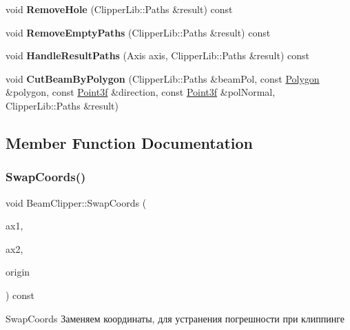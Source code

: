 \begin{DoxyCompactItemize}
\item 
\mbox{\label{class_beam_clipper_ad2f4275446958ac5bf0473cb063592f8}} 
void {\bfseries Remove\+Hole} (Clipper\+Lib\+::\+Paths \&result) const
\item 
\mbox{\label{class_beam_clipper_a288079b1c1031b1bdcdaaaf67e067318}} 
void {\bfseries Remove\+Empty\+Paths} (Clipper\+Lib\+::\+Paths \&result) const
\item 
\mbox{\label{class_beam_clipper_a8cae032f9278d61e5e3604d532e61642}} 
void {\bfseries Handle\+Result\+Paths} (Axis axis, Clipper\+Lib\+::\+Paths \&result) const
\item 
\mbox{\label{class_beam_clipper_a87e2b0717f23447e10a5104431d74cc4}} 
void {\bfseries Cut\+Beam\+By\+Polygon} (Clipper\+Lib\+::\+Paths \&beam\+Pol, const \mbox{\hyperlink{class_polygon}{Polygon}} \&polygon, const \mbox{\hyperlink{struct_point3f}{Point3f}} \&direction, const \mbox{\hyperlink{struct_point3f}{Point3f}} \&pol\+Normal, Clipper\+Lib\+::\+Paths \&result)
\end{DoxyCompactItemize}


\subsection{Member Function Documentation}
\mbox{\label{class_beam_clipper_a8afe4452a3ed644e467df223da280c2c}} 
\subsubsection{\texorpdfstring{Swap\+Coords()}{SwapCoords()}}
{\footnotesize\ttfamily void Beam\+Clipper\+::\+Swap\+Coords (\begin{DoxyParamCaption}\item[{Axis}]{ax1,  }\item[{Axis}]{ax2,  }\item[{Clipper\+Lib\+::\+Paths \&}]{origin }\end{DoxyParamCaption}) const}



Swap\+Coords Заменяем координаты, для устранения погрешности при клиппинге 


